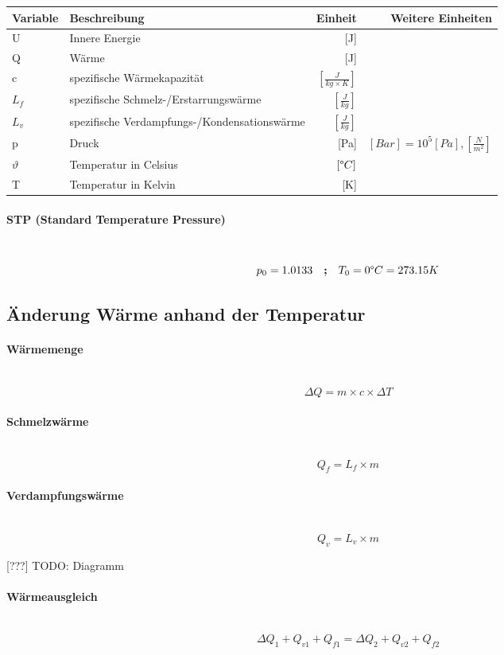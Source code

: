 \documentclass[a4paper,10pt]{article}
\newcommand{\lbparagraph}[1]{\paragraph{#1}\mbox{}\\}
\newcommand{\eqsp}[1]{\quad\textbf{;}\quad}
\begin{document}
\begin{tabular}{l|l|r|r}
    Variable & Beschreibung & Einheit & Weitere Einheiten \\
    \hline
    U & Innere Energie & [J] & \\
    Q & Wärme & [J] & \\
    c & spezifische Wärmekapazität & $[\frac{J}{kg \times K}]$ & \\
    $L_f$ & spezifische Schmelz-/Erstarrungswärme & $[\frac{J}{kg}]$ & \\
    $L_v$ & spezifische Verdampfungs-/Kondensationswärme & $[\frac{J}{kg}]$ & \\
    p & Druck & [Pa] & $[Bar] =10^5 [Pa], [\frac{N}{m^2}]$ \\
    $\vartheta$ & Temperatur in Celsius & $[{\degree}C]$ & \\
    T & Temperatur in Kelvin & [K] &
\end{tabular}

\lbparagraph{STP (Standard Temperature Pressure)}

\begin{equation}
    p_0 = 1.0133
    \eqsp{}
    T_0 = 0{\degree}C = 273.15K 
\end{equation}

\subsection{Änderung Wärme anhand der Temperatur}

\lbparagraph{Wärmemenge}

\begin{equation}
    {\Delta}Q = m \times c \times {\Delta}T
\end{equation}

\lbparagraph{Schmelzwärme}

\begin{equation}
    Q_f = L_f \times m
\end{equation}

\lbparagraph{Verdampfungswärme}

\begin{equation}
    Q_v = L_v \times m
\end{equation}

[???] TODO: Diagramm

\lbparagraph{Wärmeausgleich}

\begin{equation}
    {\Delta}Q_1 + Q_{v1} + Q_{f1} = {\Delta}Q_2 + Q_{v2} + Q_{f2}    
\end{equation}
\end{document}
